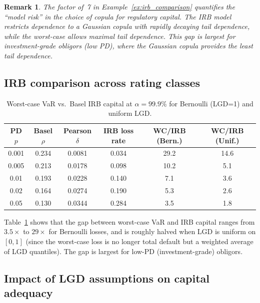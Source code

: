 \documentclass[11pt]{article}
\newtheorem{remark}[theorem]{Remark}
\theoremstyle{definition}
\newcommand{\1}{\mathbf{1}}
\begin{document}
\begin{remark}\label{rem:irb_model_risk}
The factor of~7 in Example~\ref{ex:irb_comparison} quantifies the ``model risk'' in the choice of copula for regulatory capital. The IRB model restricts dependence to a Gaussian copula with rapidly decaying tail dependence, while the worst-case allows maximal tail dependence. This gap is largest for investment-grade obligors (low PD), where the Gaussian copula provides the least tail dependence.
\end{remark}

\subsection{IRB comparison across rating classes}

\begin{table}[h]
\centering
\caption{Worst-case VaR vs.\ Basel IRB capital at $\alpha = 99.9\%$ for Bernoulli (LGD=1) and uniform LGD.}
\label{tab:basel_extended}
\begin{tabular}{cccccc}
\toprule
PD $p$ & Basel $\rho$ & Pearson $\delta$ & IRB loss rate & WC/IRB (Bern.) & WC/IRB (Unif.) \\
\midrule
0.001 & 0.234 & 0.0081 & 0.034 & 29.2 & 14.6 \\
0.005 & 0.213 & 0.0178 & 0.098 & 10.2 & 5.1 \\
0.01 & 0.193 & 0.0228 & 0.140 & 7.1 & 3.6 \\
0.02 & 0.164 & 0.0274 & 0.190 & 5.3 & 2.6 \\
0.05 & 0.130 & 0.0344 & 0.284 & 3.5 & 1.8 \\
\bottomrule
\end{tabular}
\end{table}

Table~\ref{tab:basel_extended} shows that the gap between worst-case VaR and IRB capital ranges from $3.5\times$ to $29\times$ for Bernoulli losses, and is roughly halved when LGD is uniform on $[0,1]$ (since the worst-case loss is no longer total default but a weighted average of LGD quantiles). The gap is largest for low-PD (investment-grade) obligors.

\subsection{Impact of LGD assumptions on capital adequacy}
\end{document}
